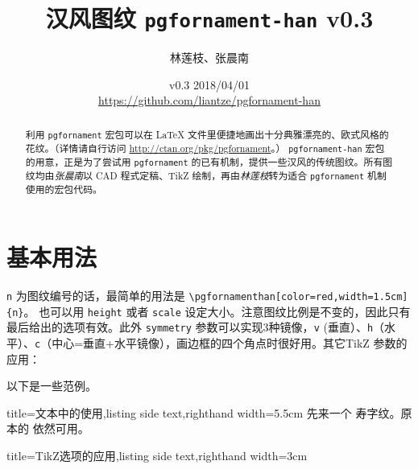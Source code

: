 \documentclass{ctexart}
\title{汉风图纹 \texttt{pgfornament-han} v0.3}
\author{林莲枝、张晨南}
\date{v0.3 2018/04/01\\\url{https://github.com/liantze/pgfornament-han}}
\newcommand{\latexinline}[1]{\lstinline|#1|}
\begin{document}
\maketitle

\begin{abstract}
利用 \texttt{pgfornament} 宏包可以在 \LaTeX{} 文件里便捷地画出十分典雅漂亮的、欧式风格的花纹。（详情请自行访问 \url{http://ctan.org/pkg/pgfornament}。）
\texttt{pgfornament-han} 宏包的用意，正是为了尝试用 \texttt{pgfornament} 的已有机制，提供一些汉风的传统图纹。所有图纹均由\emph{张晨南}以 CAD 程式定稿、TikZ 绘制，再由\emph{林莲枝}转为适合 \texttt{pgfornament} 机制使用的宏包代码。
\end{abstract}

\part{基本用法}

\texttt{n} 为图纹编号的话，最简单的用法是 \latexinline{\pgfornamenthan[color=red,width=1.5cm]{n}}。
也可以用 \texttt{height} 或者 \texttt{scale} 设定大小。注意图纹比例是不变的，因此只有最后给出的选项有效。此外 \texttt{symmetry} 参数可以实现3种镜像，\texttt{v} (垂直）、\texttt{h}（水平）、\texttt{c}（中心=垂直+水平镜像），画边框的四个角点时很好用。其它TikZ 参数的应用：

\begin{latexcode}
\end{latexcode}

以下是一些范例。

\bigskip

\begin{tcblisting}{title={文本中的使用},listing side text,righthand width=5.5cm}
先来一个 
寿字纹。原本的  依然可用。
\end{tcblisting}

\enlargethispage{\baselineskip}


\begin{tcblisting}{title={TikZ选项的应用},listing side text,righthand width=3cm}
\end{tcblisting}
\end{document}
